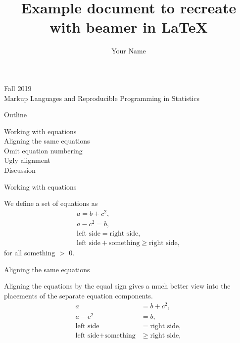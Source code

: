 \documentclass[11pt]{beamer}
\title{Example document to recreate with beamer in \LaTeX}
\subtitle{}
\author{Your Name}
\date{}
\begin{document}
\begin{frame}[plain]
  \vspace*{1.5cm}\titlepage  
  \vspace*{1cm}
  \centering Fall 2019 \\ Markup Languages and Reproducible Programming in Statistics\par
\end{frame}

\begin{frame}{Outline}

Working with equations \\
  \hspace*{0.5cm}
  Aligning the same equations \\
  \hspace*{0.5cm}
  Omit equation numbering \\
  \hspace*{0.5cm}
  Ugly alignment \\
\bigskip
\bigskip
Discussion

\end{frame}

\begin{frame}{Working with equations}

We define a set of equations as
\begin{gather}
a = b + c^2, \\
a - c^2 = b, \\
\text{left side} = \text{right side}, \\
\text{left side} + \text{something} \geq \text{right side}, 
\end{gather}
for all something $>$ 0.

\end{frame}

\begin{frame}{Aligning the same equations}

Aligning the equations by the equal sign gives a much better view into the placements of the separate equation components.
\begin{align}
a &= b + c^2, \\
a - c^2 &= b, \\
\text{left side} &= \text{right side}, \\
\text{left side} + \text{something} &\geq \text{right side}, 
\end{align}

\end{frame}
\end{document}
